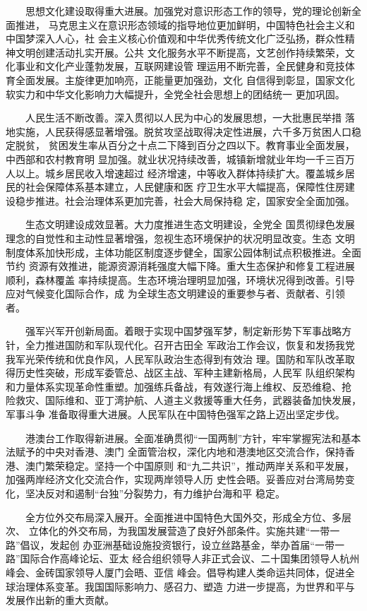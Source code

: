 \documentclass[11pt]{ctexart}
\begin{document}
{{{{　　思想文化建设取得重大进展。加强党对意识形态工作的领导，党的理论创新全面推进，
马克思主义在意识形态领域的指导地位更加鲜明，中国特色社会主义和中国梦深入人心，社
会主义核心价值观和中华优秀传统文化广泛弘扬，群众性精神文明创建活动扎实开展。公共
文化服务水平不断提高，文艺创作持续繁荣，文化事业和文化产业蓬勃发展，互联网建设管
理运用不断完善，全民健身和竞技体育全面发展。主旋律更加响亮，正能量更加强劲，文化
自信得到彰显，国家文化软实力和中华文化影响力大幅提升，全党全社会思想上的团结统一
更加巩固。

　　人民生活不断改善。深入贯彻以人民为中心的发展思想，一大批惠民举措
落地实施，人民获得感显著增强。脱贫攻坚战取得决定性进展，六千多万贫困人口稳定脱贫，
贫困发生率从百分之十点二下降到百分之四以下。教育事业全面发展，中西部和农村教育明
显加强。就业状况持续改善，城镇新增就业年均一千三百万人以上。城乡居民收入增速超过
经济增速，中等收入群体持续扩大。覆盖城乡居民的社会保障体系基本建立，人民健康和医
疗卫生水平大幅提高，保障性住房建设稳步推进。社会治理体系更加完善，社会大局保持稳
定，国家安全全面加强。

　　生态文明建设成效显著。大力度推进生态文明建设，全党全
国贯彻绿色发展理念的自觉性和主动性显著增强，忽视生态环境保护的状况明显改变。生态
文明制度体系加快形成，主体功能区制度逐步健全，国家公园体制试点积极推进。全面节约
资源有效推进，能源资源消耗强度大幅下降。重大生态保护和修复工程进展顺利，森林覆盖
率持续提高。生态环境治理明显加强，环境状况得到改善。引导应对气候变化国际合作，成
为全球生态文明建设的重要参与者、贡献者、引领者。

　　强军兴军开创新局面。着眼于实现中国梦强军梦，制定新形势下军事战略方针，全力推进国防和军队现代化。召开古田全
军政治工作会议，恢复和发扬我党我军光荣传统和优良作风，人民军队政治生态得到有效治
理。国防和军队改革取得历史性突破，形成军委管总、战区主战、军种主建新格局，人民军
队组织架构和力量体系实现革命性重塑。加强练兵备战，有效遂行海上维权、反恐维稳、抢
险救灾、国际维和、亚丁湾护航、人道主义救援等重大任务，武器装备加快发展，军事斗争
准备取得重大进展。人民军队在中国特色强军之路上迈出坚定步伐。

　　港澳台工作取得新进展。全面准确贯彻“一国两制”方针，牢牢掌握宪法和基本法赋予的中央对香港、澳门
全面管治权，深化内地和港澳地区交流合作，保持香港、澳门繁荣稳定。坚持一个中国原则
和“九二共识”，推动两岸关系和平发展，加强两岸经济文化交流合作，实现两岸领导人历
史性会晤。妥善应对台湾局势变化，坚决反对和遏制“台独”分裂势力，有力维护台海和平
稳定。

　　全方位外交布局深入展开。全面推进中国特色大国外交，形成全方位、多层次、
立体化的外交布局，为我国发展营造了良好外部条件。实施共建“一带一路”倡议，发起创
办亚洲基础设施投资银行，设立丝路基金，举办首届“一带一路”国际合作高峰论坛、亚太
经合组织领导人非正式会议、二十国集团领导人杭州峰会、金砖国家领导人厦门会晤、亚信
峰会。倡导构建人类命运共同体，促进全球治理体系变革。我国国际影响力、感召力、塑造
力进一步提高，为世界和平与发展作出新的重大贡献。

}}}}
\end{document}

